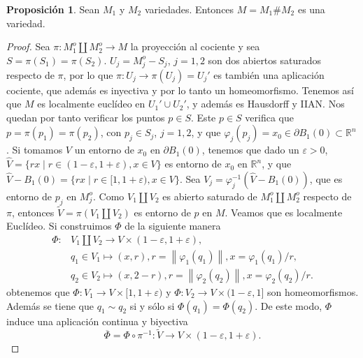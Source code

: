 \documentclass[10pt]{report}
\newcommand{\R}{\mathbb{R}}
\newcommand{\norm}[1]{\left\lVert#1\right\rVert} %
\theoremstyle{definition}
\newtheorem{prop}[defin]{Proposición}
\begin{document}
\begin{prop}%
Sean $M_1$ y $M_2$ variedades. Entonces $M=M_1\#M_2$ es una variedad.
\end{prop}
\begin{proof}

Sea $\pi:M_1^o\amalg M_2^o\to M$ la proyección al cociente y sea $S=\pi (S_1)=\pi (S_2)$.  $U_j=M_j^o-S_j$, $j=1,2$ son dos abiertos saturados respecto de $\pi$, por lo que $\pi :U_ j\to \pi (U_j)=U_j'$ es también una aplicación cociente, que además es inyectiva y por lo tanto un homeomorfismo. Tenemos así que $M$ es localmente euclídeo en $U_1'\cup U_2'$, y además es Hausdorff y IIAN. Nos quedan por tanto verificar los puntos $p\in S$.
Este $p\in S$ verifica que $p=\pi (p_1)=\pi (p_2)$, con $p_j\in S_j$, $j=1,2$, y que  $\varphi_j(p_j)=x_0 \in \partial B_1(0) \subset \R^n$. Si tomamos $V$ un entorno de $x_0$ en $\partial B_1(0)$, tenemos que dado un $\varepsilon >0$, $\hat{V}=\{rx\mid   r\in (1-\varepsilon , 1+\varepsilon ), x\in V\} $ es entorno de $x_0$ en $\R^n$, y que $\hat{V}-B_1(0)=\{rx\mid r\in [1, 1+\varepsilon ), x \in V\}$. Sea $V_j=\varphi_j^{-1}(\hat{V}-B_1(0))$, que es entorno de $p_j$ en $M_j^o$. Como $ V_1\amalg V_2$ es abierto saturado de $M_1^o\amalg M_2^o$ respecto de $\pi$, entonces $\tilde{V}=\pi (V _1\amalg V_2)$ es entorno de $p$ en $M$. Veamos que es localmente Euclídeo. Si construimos $\Phi$ de la siguiente manera
\begin{align*}
\Phi : &  V_1\amalg V_2  \to  V\times (1-\varepsilon , 1+ \varepsilon ), \\
& q_1\in  V_1  \mapsto  (x,r), r=\norm{\varphi_1(q_1)}, x=\varphi_1(q_1)/r,\\
& q_2\in V_2  \mapsto  (x,2-r), r= \norm{\varphi_2(q_2)}, x= \varphi_2(q_2)/r.
\end{align*}
obtenemos que $\Phi :  V_1 \to V \times [1, 1+\varepsilon)$ y $\Phi : V_2 \to V \times (1- \varepsilon, 1]$ son homeomorfismos. Además se tiene que $q_1 \sim q_2$ si y sólo si $\Phi(q_1)=\Phi(q_2)$.  De este modo, $\Phi$ induce una aplicación continua y biyectiva $$\overline{\Phi}=\Phi \circ \pi^{-1}: \tilde{V} \to V \times (1- \varepsilon, 1+ \varepsilon).$$

\end{proof}
\end{document}
